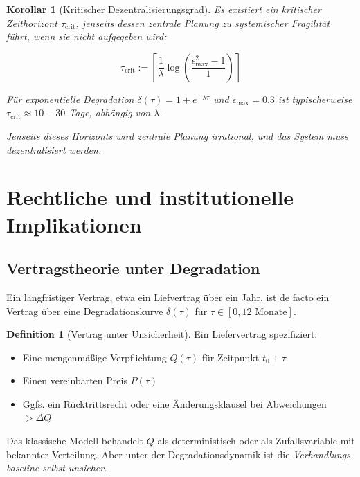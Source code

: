\documentclass[a4paper, 12pt, twoside, openright]{report}
\newtheorem{corollary}[theorem]{Korollar}
\theoremstyle{definition}
\newtheorem{definition}[theorem]{Definition}
\theoremstyle{definition}
\begin{document}
\begin{corollary}[Kritischer Dezentralisierungsgrad]
Es existiert ein kritischer Zeithorizont $\tau_{\text{crit}}$, jenseits dessen zentrale Planung zu systemischer Fragilität führt, wenn sie nicht aufgegeben wird:

\begin{equation}
\tau_{\text{crit}} := \left\lceil \frac{1}{\lambda} \log\left(\frac{\epsilon_{\max}^2 - 1}{1}\right) \right\rceil
\label{eq:critical_horizon}
\end{equation}

Für exponentielle Degradation $\delta(\tau) = 1 + e^{-\lambda\tau}$ und $\epsilon_{\max} = 0.3$ ist typischerweise $\tau_{\text{crit}} \approx 10-30$ Tage, abhängig von $\lambda$.

Jenseits dieses Horizonts wird zentrale Planung irrational, und das System muss dezentralisiert werden.
\end{corollary}

\section{Rechtliche und institutionelle Implikationen}
\label{sec:recht}

\subsection{Vertragstheorie unter Degradation}

Ein langfristiger Vertrag, etwa ein Liefvertrag über ein Jahr, ist de facto ein Vertrag über eine Degradationskurve $\delta(\tau)$ für $\tau \in [0, 12 \text{ Monate}]$.

\begin{definition}[Vertrag unter Unsicherheit]
Ein Liefervertrag spezifiziert:
\begin{itemize}
  \item Eine mengenmäßige Verpflichtung $Q(\tau)$ für Zeitpunkt $t_0 + \tau$
  \item Einen vereinbarten Preis $P(\tau)$
  \item Ggfs. ein Rücktrittsrecht oder eine Änderungsklausel bei Abweichungen $> \Delta Q$
\end{itemize}

Das klassische Modell behandelt $Q$ als deterministisch oder als Zufallsvariable mit bekannter Verteilung. Aber unter der Degradationsdynamik ist die \emph{Verhandlungs-baseline selbst unsicher}.
\end{definition}
\end{document}
